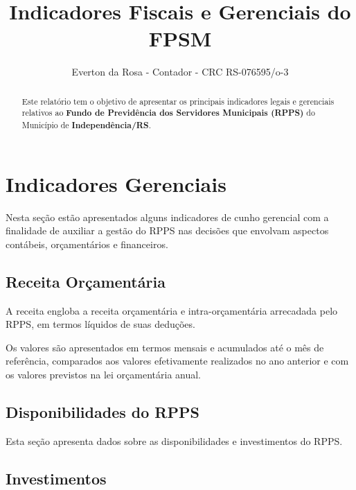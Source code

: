 \documentclass[12pt, a4paper]{article}
\title{Indicadores Fiscais e Gerenciais do FPSM}
\author{Everton da Rosa - Contador - CRC RS-076595/o-3}
\begin{document}
\maketitle

\begin{abstract}
Este relatório tem o objetivo de apresentar os principais indicadores legais e gerenciais relativos ao \textbf{Fundo de Previdência dos Servidores Municipais (RPPS)} do Município de \textbf{Independência/RS}.
\end{abstract}

\tableofcontents

\section{Indicadores Gerenciais}

Nesta seção estão apresentados alguns indicadores de cunho gerencial com a finalidade de auxiliar a gestão do RPPS nas decisões que envolvam aspectos contábeis, orçamentários e financeiros.

\subsection{Receita Orçamentária}

A receita engloba a receita orçamentária e intra-orçamentária arrecadada pelo RPPS, em termos líquidos de suas deduções.

Os valores são apresentados em termos mensais e acumulados até o mês de referência, comparados aos valores efetivamente realizados no ano anterior e com os valores previstos na lei orçamentária anual.






\subsection{Disponibilidades do RPPS}

Esta seção apresenta dados sobre as disponibilidades e investimentos do RPPS.



\subsection{Investimentos}
\end{document}

